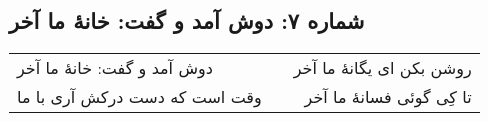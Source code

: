 \begin{center}
\section*{شماره ۷: دوش آمد و گفت: خانۀ ما آخر}
\label{sec:007}
\begin{longtable}{l p{0.5cm} r}
دوش آمد و گفت: خانهٔ ما آخر
&&
روشن بکن ای یگانهٔ ما آخر
\\
وقت است که دست درکش آری با ما
&&
تا کِی گوئی فسانهٔ ما آخر
\\
\end{longtable}
\end{center}
